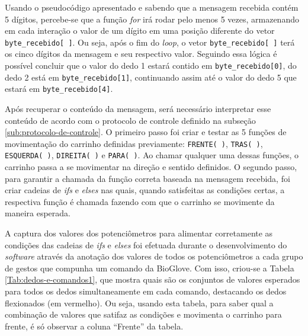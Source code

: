 \documentclass[
	12pt,				%
	openright,			%
	oneside,			%
	a4paper,			%
	english,			%
	brazil				%
	]{abntex2}
\begin{document}
		Usando o pseudocódigo apresentado e sabendo que a mensagem recebida contém 5 dígitos, percebe-se que a função \textit{for} irá rodar pelo menos 5 vezes, armazenando em cada interação o valor de um dígito em uma posição diferente do vetor \texttt{byte\_recebido[ ]}. Ou seja, após o fim do \textit{loop}, o vetor \texttt{byte\_recebido[ ]} terá os cinco dígitos da mensagem e seu respectivo valor. Seguindo essa lógica é possível concluir que o valor do dedo 1 estará contido em \texttt{byte\_recebido[0]}, do dedo 2 está em \texttt{byte\_recebido[1]}, continuando assim até o valor do dedo 5 que estará em \texttt{byte\_recebido[4]}.
		
		Após recuperar o conteúdo da mensagem, será necessário interpretar esse conteúdo de acordo com o protocolo de controle definido na subseção \ref{sub:protocolo-de-controle}. O primeiro passo foi criar e testar as 5 funções de movimentação do carrinho definidas previamente: \texttt{FRENTE( )}, \texttt{TRAS( )}, \texttt{ESQUERDA( )}, \texttt{DIREITA( )} e \texttt{PARA( )}. Ao chamar qualquer uma dessas funções, o carrinho passa a se movimentar na direção e sentido definidos. O segundo passo, para garantir a chamada da função correta baseada na mensagem recebida, foi criar cadeias de \textit{ifs} e \textit{elses} nas quais, quando satisfeitas as condições certas, a respectiva função é chamada fazendo com que o carrinho se movimente da maneira esperada. 
		
		A captura dos valores dos potenciômetros para alimentar corretamente as condições das cadeias de \textit{ifs} e \textit{elses} foi efetuada durante o desenvolvimento do \textit{software} através da anotação dos valores de todos os potenciômetros a cada grupo de gestos que compunha um comando da BioGlove. Com isso, criou-se a Tabela \ref{Tab:dedos-e-comandos1}, que mostra quais são os conjuntos de valores esperados para todos os dedos simultaneamente em cada comando, destacando os dedos flexionados (em vermelho). Ou seja, usando esta tabela, para saber qual a combinação de valores que satifaz as condições e movimenta o carrinho para frente, é só observar a coluna ``Frente'' da tabela. 
\end{document}

